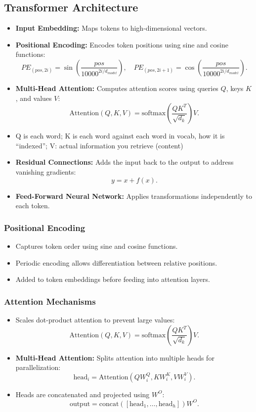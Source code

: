 \documentclass[12pt,a4paper]{article}
\begin{document}
\subsection{Transformer Architecture}
\begin{itemize}
    \item \textbf{Input Embedding:} Maps tokens to high-dimensional vectors.
    \item \textbf{Positional Encoding:} Encodes token positions using sine and cosine functions:
    \[ PE_{(pos, 2i)} = \sin\left(\frac{pos}{10000^{2i/d_{model}}}\right), \quad PE_{(pos, 2i+1)} = \cos\left(\frac{pos}{10000^{2i/d_{model}}}\right). \]
    \item \textbf{Multi-Head Attention:} Computes attention scores using queries $Q$, keys $K$, and values $V$:
    \[ \text{Attention}(Q, K, V) = \text{softmax}\left(\frac{QK^T}{\sqrt{d_k}}\right)V. \]
    \item Q is each word;
    K is each word against each word in vocab, how it is ``indexed''; V: actual information you retrieve  (content)
    \item \textbf{Residual Connections:} Adds the input back to the output to address vanishing gradients:
    \[ y = x + f(x). \]
    \item \textbf{Feed-Forward Neural Network:} Applies transformations independently to each token.
\end{itemize}
\subsubsection{Positional Encoding}
\begin{itemize}
    \item Captures token order using sine and cosine functions.
    \item Periodic encoding allows differentiation between relative positions.
    \item Added to token embeddings before feeding into attention layers.
\end{itemize}
\subsubsection{Attention Mechanisms}
\begin{itemize}
    \item Scales dot-product attention to prevent large values:
    \[ \text{Attention}(Q, K, V) = \text{softmax}\left(\frac{QK^T}{\sqrt{d_k}}\right)V. \]
    \item \textbf{Multi-Head Attention:} Splits attention into multiple heads for parallelization:
    \[ \text{head}_i = \text{Attention}(QW_i^Q, KW_i^K, VW_i^V). \]
    \item Heads are concatenated and projected using $W^O$:
    \[ \text{output} = \text{concat}([\text{head}_1, \ldots, \text{head}_h])W^O. \]
\end{itemize}
\end{document}
